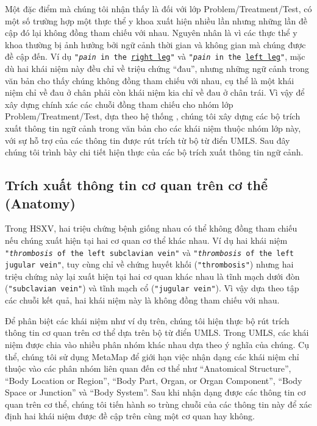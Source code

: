 Một đặc điểm mà chúng tôi nhận thấy là đối với lớp Problem/Treatment/Test, có một số trường hợp một thực thể y khoa xuất hiện nhiều lần nhưng những lần đề cập đó lại không đồng tham chiếu với nhau. Nguyên nhân là vì các thực thể y khoa thường bị ảnh hưởng bởi ngữ cảnh thời gian và không gian mà chúng được đề cập đến. Ví dụ \texttt{"\textsl{pain} in the \underline{right leg}"} và \texttt{"\textsl{pain} in the \underline{left leg}"}, mặc dù hai khái niệm này đều chỉ về triệu chứng ``đau'', nhưng những ngữ cảnh trong văn bản cho thấy chúng không đồng tham chiếu với nhau, cụ thể là một khái niệm chỉ về đau ở chân phải còn khái niệm kia chỉ về đau ở chân trái. Vì vậy để xây dựng chính xác các chuỗi đồng tham chiếu cho nhóm lớp Problem/Treatment/Test, dựa theo hệ thống \cite{YanXu2012}, chúng tôi xây dựng các bộ trích xuất thông tin ngữ cảnh trong văn bản cho các khái niệm thuộc nhóm lớp này, với sự hỗ trợ của các thông tin được rút trích từ bộ từ điển UMLS. Sau đây chúng tôi trình bày chi tiết hiện thực của các bộ trích xuất thông tin ngữ cảnh.

\subsection*{Trích xuất thông tin cơ quan trên cơ thể (Anatomy)}
Trong HSXV, hai triệu chứng bệnh giống nhau có thể không đồng tham chiếu nếu chúng xuất hiện tại hai cơ quan cơ thể khác nhau. Ví dụ hai khái niệm \texttt{"\textsl{thrombosis} of the left subclavian vein"} và \texttt{"\textsl{thrombosis} of the left jugular vein"}, tuy cùng chỉ về chứng huyết khối (\texttt{"thrombosis"}) nhưng hai triệu chứng này lại xuất hiện tại hai cơ quan khác nhau là tĩnh mạch dưới đòn (\texttt{"subclavian vein"}) và tĩnh mạch cổ (\texttt{"jugular vein"}). Vì vậy dựa theo tập các chuỗi kết quả, hai khái niệm này là không đồng tham chiếu với nhau.

Để phân biệt các khái niệm như ví dụ trên, chúng tôi hiện thực bộ rút trích thông tin cơ quan trên cơ thể dựa trên bộ từ điển UMLS. Trong UMLS, các khái niệm được chia vào nhiều phân nhóm khác nhau dựa theo ý nghĩa của chúng. Cụ thể, chúng tôi sử dụng MetaMap để giới hạn việc nhận dạng các khái niệm chỉ thuộc vào các phân nhóm liên quan đến cơ thể như ``Anatomical Structure'', ``Body Location or Region'', ``Body Part, Organ, or Organ Component'', ``Body Space or Junction'' và ``Body System''. Sau khi nhận dạng được các thông tin cơ quan trên cơ thể, chúng tôi tiến hành so trùng chuỗi của các thông tin này để xác định hai khái niệm được đề cập trên cùng một cơ quan hay không.

